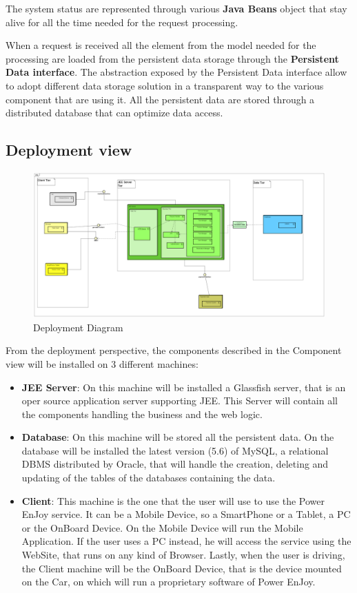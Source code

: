 The system status are represented through various \textbf{Java Beans} object that stay alive for all the time needed for the request processing.

When a request is received all the element from the model needed for the processing are loaded from the persistent data storage through the \textbf{Persistent Data interface}. The abstraction exposed by the Persistent Data interface allow to adopt different data storage solution in a transparent way to the various component that are using it. All the persistent data are stored through a distributed database that can optimize data access.

\newpage

\subsection{Deployment view}\label{deployment}
 	
\begin{figure}[H]	
	\centering
	\includegraphics[width=\textwidth]{img/deployment_diagram}
	\caption{Deployment Diagram}
\end{figure}

From the deployment perspective, the components described in the Component view will be installed on 3 different machines:

\begin{itemize}
\item \textbf{JEE Server}: On this machine will be installed a Glassfish server, that is an oper source application server supporting JEE. This Server will contain all the components handling the business and the web logic.
\item \textbf{Database}: On this machine will be stored all the persistent data. On the database will be installed the latest version (5.6) of MySQL, a relational DBMS distributed by Oracle, that will handle the creation, deleting and updating of the tables of the databases containing the data.
\item \textbf{Client}: This machine is the one that the user will use to use the Power EnJoy service. It can be a Mobile Device, so a SmartPhone or a Tablet, a PC or the OnBoard Device. On the Mobile Device will run the Mobile Application. If the user uses a PC instead, he will access the service using the WebSite, that runs on any kind of Browser. Lastly, when the user is driving, the Client machine will be the OnBoard Device, that is the device mounted on the Car, on which will run a proprietary software of Power EnJoy.
\end{itemize}

